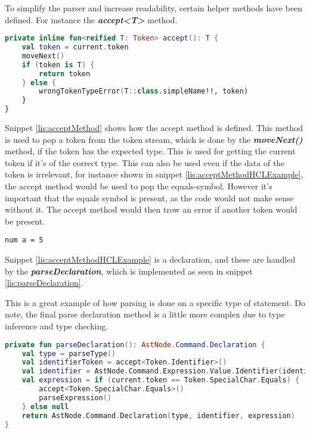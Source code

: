 To simplify the parser and increase readability, certain helper methods have been defined. 
For instance the \textit{\textbf{accept<T>}} method. 
\begin{lstlisting}[language=Kotlin,label={lis:acceptMethod},caption=The definition of the accept method on the parser]
private inline fun<reified T: Token> accept(): T {
	val token = current.token
	moveNext()
	if (token is T) {
		return token
	} else {
		wrongTokenTypeError(T::class.simpleName!!, token)
	}
}
\end{lstlisting}
Snippet \ref{lis:acceptMethod} shows how the accept method is defined.
This method is used to pop a token from the token stream, which is done by the \textit{\textbf{moveNext()}} method, if the token has the expected type.
This is used for getting the current token if it's of the correct type. 
This can also be used even if the data of the token is irrelevant, for instance shown in snippet \ref{lis:acceptMethodHCLExample}, the accept method would be used to pop the equals-symbol. 
However it's important that the equals symbol is present, as the code would not make sense without it. 
The accept method would then trow an error if another token would be present.

\begin{lstlisting}[language=HCL,label={lis:acceptMethodHCLExample},caption={An example of a declaration in HCL, where the accept method is used by the parser.}]
num a = 5
\end{lstlisting}
Snippet \ref{lis:acceptMethodHCLExample} is a declaration, and these are handled by the \textit{\textbf{parseDeclaration}}, which is implemented as seen in snippet \ref{lis:parseDeclaration}.

This is a great example of how parsing is done on a specific type of statement.
Do note, the final parse declaration method is a little more complex due to type inference and type checking.

\begin{lstlisting}[language=Kotlin,label=lis:parseDeclaration,caption=A simplified version of the parse declaration method from the parser.]
private fun parseDeclaration(): AstNode.Command.Declaration {
    val type = parseType()
    val identifierToken = accept<Token.Identifier>()
    val identifier = AstNode.Command.Expression.Value.Identifier(identifierToken.value)
    val expression = if (current.token == Token.SpecialChar.Equals) {
	    accept<Token.SpecialChar.Equals>()
	    parseExpression()
    } else null
    return AstNode.Command.Declaration(type, identifier, expression)
}
\end{lstlisting}


